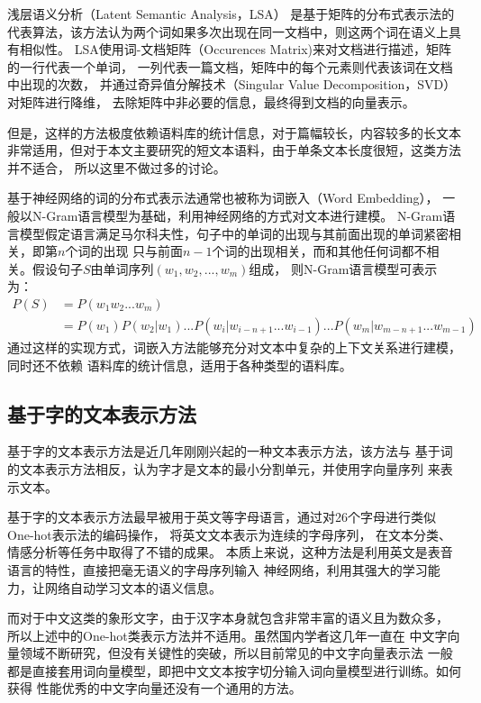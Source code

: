 \documentclass{standalone}
\begin{document}
浅层语义分析（Latent Semantic Analysis，LSA）
是基于矩阵的分布式表示法的
代表算法，该方法认为两个词如果多次出现在同一文档中，则这两个词在语义上具有相似性。
LSA使用词-文档矩阵（Occurences Matrix)来对文档进行描述，矩阵的一行代表一个单词，
一列代表一篇文档，矩阵中的每个元素则代表该词在文档中出现的次数，
并通过奇异值分解技术（Singular Value Decomposition，SVD）对矩阵进行降维，
去除矩阵中非必要的信息，最终得到文档的向量表示。

但是，这样的方法极度依赖语料库的统计信息，对于篇幅较长，内容较多的长文本
非常适用，但对于本文主要研究的短文本语料，由于单条文本长度很短，这类方法并不适合，
所以这里不做过多的讨论。

基于神经网络的词的分布式表示法通常也被称为词嵌入（Word Embedding），
一般以N-Gram语言模型为基础，利用神经网络的方式对文本进行建模。
N-Gram语言模型假定语言满足马尔科夫性，句子中的单词的出现与其前面出现的单词紧密相关，即第$n$个词的出现
只与前面$n-1$个词的出现相关，而和其他任何词都不相关。假设句子$S$由单词序列$\left (w_1,w_2,...,w_m  \right )$组成，
则N-Gram语言模型可表示为：
\begin{equation}
    \begin{aligned}
        P\left ( S \right )&=P\left ( w_1w_2...w_m \right )\\
        &=P\left ( w_1 \right )P\left ( w_2|w_1 \right )...
P\left ( w_i|w_{i-n+1}...w_{i-1} \right )...P\left ( w_m|w_{m-n+1}...w_{m-1} \right )
    \end{aligned}
    \label{n-gram}
\end{equation}
通过这样的实现方式，词嵌入方法能够充分对文本中复杂的上下文关系进行建模，同时还不依赖
语料库的统计信息，适用于各种类型的语料库。

\subsection{基于字的文本表示方法}
\label{char_rep}
基于字的文本表示方法是近几年刚刚兴起的一种文本表示方法，该方法与
基于词的文本表示方法相反，认为字才是文本的最小分割单元，并使用字向量序列
来表示文本。

基于字的文本表示方法最早被用于英文等字母语言，通过对26个字母进行类似One-hot表示法的编码操作，
将英文文本表示为连续的字母序列，
在文本分类、情感分析等任务中取得了不错的成果。
本质上来说，这种方法是利用英文是表音语言的特性，直接把毫无语义的字母序列输入
神经网络，利用其强大的学习能力，让网络自动学习文本的语义信息。

而对于中文这类的象形文字，由于汉字本身就包含非常丰富的语义且为数众多，
所以上述中的One-hot类表示方法并不适用。虽然国内学者这几年一直在
中文字向量领域不断研究，但没有关键性的突破，所以目前常见的中文字向量表示法
一般都是直接套用词向量模型，即把中文文本按字切分输入词向量模型进行训练。如何获得
性能优秀的中文字向量还没有一个通用的方法。
\end{document}
